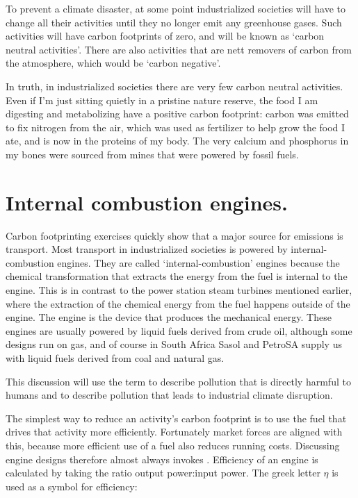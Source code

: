 To prevent a climate disaster, at some point industrialized societies will have
to change all their activities until they no longer emit any greenhouse gases.
Such activities will have carbon footprints of zero, and will be known as
`carbon neutral activities'. There are also activities that are nett removers of
carbon from the atmosphere, which would be `carbon negative'.

In truth, in industrialized societies there are very few carbon neutral
activities. Even if I'm just sitting quietly in a pristine nature reserve, the
food I am digesting and metabolizing have a positive carbon footprint: carbon
was emitted to fix nitrogen from the air, which was used as fertilizer to help
grow the food I ate, and is now in the proteins of my body. The very calcium and
phosphorus in my bones were sourced from mines that were powered by fossil
fuels. 

\section{Internal combustion engines.}

Carbon footprinting exercises quickly show that a major source for emissions is
transport. Most transport in industrialized societies is powered by
internal\hyp{}combustion engines. They are called `internal\hyp{}combustion' engines
because the chemical transformation that extracts the energy from the fuel is
internal to the engine. This is in contrast to the power station steam turbines
mentioned earlier, where the extraction of the chemical energy from the fuel
happens outside of the engine. The engine is the device that produces the
mechanical energy. These engines are usually powered by liquid fuels derived
from crude oil, although some designs run on gas, and of course in South Africa
Sasol and PetroSA supply us with liquid fuels derived from coal and natural gas.

This discussion will use the term  to describe
pollution that is directly harmful to humans and  to
describe pollution that leads to industrial climate disruption.

The simplest way to reduce an activity's carbon footprint is to use the fuel
that drives that activity more efficiently. Fortunately market forces are
aligned with this, because more efficient use of a fuel also reduces running
costs. Discussing engine designs therefore almost always invokes
. Efficiency of an engine is calculated by taking the ratio
output power:input power. The greek letter \(\eta\) is used as a symbol for
efficiency:

